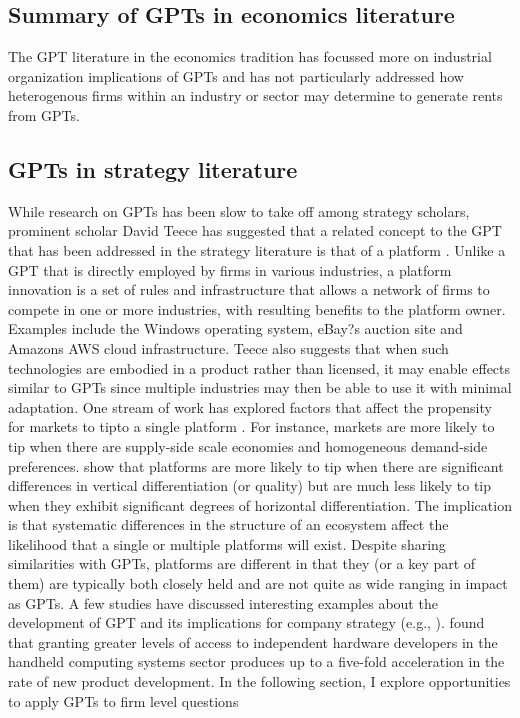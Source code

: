 \documentclass[12pt,letterpaper]{article}
\begin{document}
\subsection{Summary of GPTs in economics literature}
The GPT literature in the economics tradition has focussed more on industrial organization implications of GPTs and has not particularly addressed how heterogenous firms within an industry or sector may determine to generate rents from GPTs.

\subsection{GPTs in strategy literature}
While research on GPTs has been slow to take off among strategy scholars, prominent scholar David Teece has suggested that a related concept to the GPT that has been addressed in the strategy literature is that of a platform \citep{Gawer2002, Teece2012a}. Unlike a
GPT that is directly employed by firms in various industries, a platform innovation is a set of rules and infrastructure that allows a
network of firms to compete in one or more industries, with resulting benefits to the platform owner. Examples include the Windows operating system, eBay?s auction site and Amazon\textquotesingle s AWS cloud infrastructure. Teece also suggests that when such technologies are embodied in a product rather than licensed, it may enable effects similar to GPTs since multiple industries may then be able to use it with minimal adaptation. One stream of work has explored factors that affect the propensity for markets to \textquotesingle tip\textquotesingle to a single platform \citep{Katz1994}. For instance, markets are more likely to tip when there are supply-side scale economies and homogeneous demand-side preferences. \cite{Hosasain2011} show that platforms are more likely to tip when there are significant differences in vertical differentiation (or quality) but are much less likely to tip when they exhibit significant degrees of horizontal differentiation. The implication is that systematic differences in the structure of an ecosystem affect the likelihood that a single or multiple platforms will exist. Despite sharing similarities with GPTs, platforms are different in that they (or a key part of them) are typically both closely held and are not quite as wide ranging in impact as GPTs. A few studies have discussed interesting examples about the development of GPT and its implications for company strategy (e.g., \cite{Maine2006, Thoma2009} ). \cite{Boudreau2010} found that granting greater levels of access to independent hardware developers in the handheld computing systems sector produces up to a five-fold acceleration in the rate of new product development. In the following section, I explore opportunities to apply GPTs to firm level questions
\end{document}
